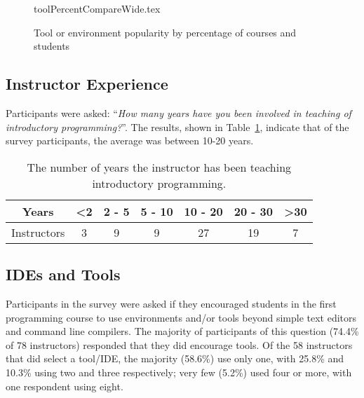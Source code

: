 \documentclass[english,submission]{programming}
\begin{document}
\begin{figure}
\begin{center}
{toolPercentCompareWide.tex}
\caption{Tool or environment popularity by percentage of courses and students\label{fig:tools}}
\end{center}
\end{figure}

\subsection{Instructor Experience}

Participants were asked: ``{\emph{How many years have you been
involved in teaching of introductory programming?}}''. The results,
shown in Table~\ref{tab:yearsTeaching}, indicate that of the survey
participants, the average was between 10-20 years.


\begin{table}[ht]
\centering
\caption{The number of years the instructor has been teaching introductory programming.}
\vspace{0.5cm}
\label{tab:yearsTeaching}
\begin{tabular}{ccccccc}
\hline
Years       & \textless 2 & 2 - 5 & 5 - 10 & 10 - 20 & 20 - 30 & \textgreater 30 \\ \hline
Instructors & 3          & 9     & 9      & 27      & 19      & 7              \\ \hline
\end{tabular}
\end{table}

\subsection{IDEs and Tools}


Participants in the survey were asked if they encouraged students in
the first programming course to use environments and/or tools beyond
simple text editors and command line compilers. The majority of
participants of this question (74.4\% of 78 instructors) responded
that they did encourage tools. Of the 58 instructors that did select a
tool/IDE, the majority (58.6\%) use only one, with 25.8\% and 10.3\%
using two and three respectively; very few (5.2\%) used four or more,
with one respondent using eight.
\end{document}
